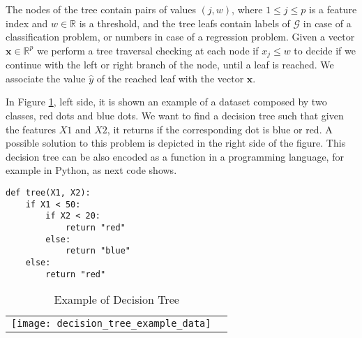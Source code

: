  The nodes of the tree contain pairs of values $(j, w)$, where $1 \leq j \leq p$ is a feature index and $w \in \mathbb{R}$ is a threshold, and the tree leafs contain labels of $\mathcal{G}$ in case of a classification problem, or numbers in case of a regression problem. Given a vector $\textbf{x} \in \mathbb{R}^p$ we perform a tree traversal checking at each node if $x_j \leq w$ to decide if we continue with the left or right branch of the node, until a leaf is reached. We associate the value $\hat{y}$ of the reached leaf with the vector $\textbf{x}$. 

\begin{example}
\label{ex:example_tree}
In Figure \ref{tab:DecisionTreeExample}, left side, it is shown an example of a dataset composed by two classes, red dots and blue dots. We want to find a decision tree such that given the features $X1$ and $X2$, it returns if the corresponding dot is blue or red. A possible solution to this problem is depicted in the right side of the figure. This decision tree can be also encoded as a function in a programming language, for example in Python, as next code shows.

\begin{sourcecode}
{\scriptsize \begin{verbatim}
def tree(X1, X2):
    if X1 < 50:
        if X2 < 20:
            return "red"
        else:
            return "blue"
    else:
        return "red"
\end{verbatim}}
\end{sourcecode}

\end{example}

\begin{table}
\begin{center}

\begin{tabular}{ c c }

\texttt{[image: decision\_tree\_example\_data]} & \raisebox{.4\height}{\texttt{[image: decision\_tree\_example]}}

\end{tabular}
\end{center}
\caption{\label{tab:DecisionTreeExample}Example of Decision Tree}
\end{table}

